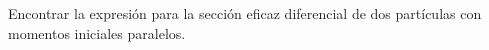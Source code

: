Encontrar la expresión para la sección eficaz diferencial de dos partículas con momentos iniciales paralelos.

\begin{solution}\ \\

\end{solution}